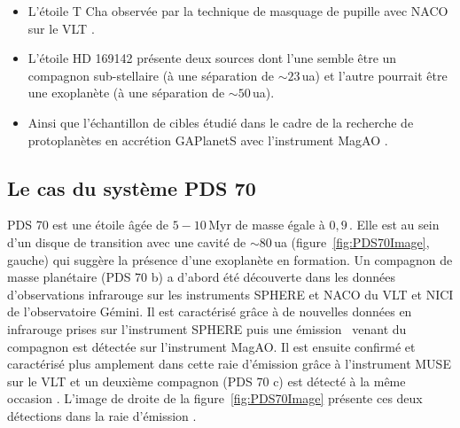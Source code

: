 \begin{itemize}
    \item L'étoile T Cha observée par la technique de masquage de pupille avec \ac{NACO} sur le \ac{VLT} \citep{huelamo2011}.

    \item L'étoile HD 169142 présente deux sources \citep{quanz2013b, biller2014, reggiani2014} dont l'une semble être un compagnon sub-stellaire (à une séparation de $\sim 23 \,$ua) et l'autre pourrait être une exoplanète (à une séparation de $\sim 50 \,$ua).
    
    \item Ainsi que l'échantillon de cibles étudié dans le cadre de la recherche de protoplanètes en accrétion \ac{GAPlanetS} avec l'instrument \ac{MagAO} \citep{follette2022}.
\end{itemize}


\subsection{Le cas du système PDS 70}
\label{sec:pds70}

PDS 70 est une étoile âgée de $5 - 10 \,$Myr de masse égale à $0,9 \,$\MS. Elle est au sein d'un disque de transition avec une cavité de $\sim 80 \,$ua (figure~\ref{fig:PDS70Image}, gauche) qui suggère la présence d'une exoplanète en formation. Un compagnon de masse planétaire (PDS 70 b) a d'abord été découverte \citep{keppler2018} dans les données d'observations infrarouge sur les instruments \ac{SPHERE} et \ac{NACO} du \ac{VLT} et \ac{NICI} de l'observatoire Gémini. Il est caractérisé grâce à de nouvelles données en infrarouge prises sur l'instrument \ac{SPHERE} \citep{muller2018} puis une émission \ha~venant du compagnon est détectée \citep{wagner2018} sur l'instrument \ac{MagAO}. Il est ensuite confirmé et caractérisé plus amplement dans cette raie d'émission grâce à l'instrument \ac{MUSE} sur le \ac{VLT} et un deuxième compagnon (PDS 70 c) est détecté à la même occasion \citep{haffert2019}. L'image de droite de la figure~\ref{fig:PDS70Image} présente ces deux détections dans la raie d'émission \ha.

